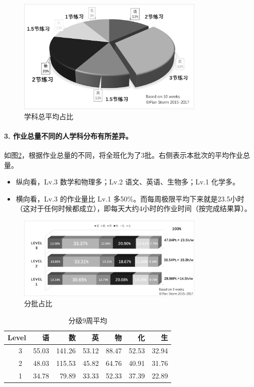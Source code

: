 \documentclass[a4paper,12pt]{article}
\begin{document}
\begin{CJK}{UTF8}{song}
\begin{figure}[H]
    \centering
    \includegraphics[width=0.8\textwidth]{img/2.png}
    \caption{学科总平均占比}
    \label{ratio}
\end{figure}

\paragraph{3. 作业总量不同的人学科分布有所差异。 } 如图\ref{lv}，根据作业总量的不同，将全班化为了3批。右侧表示本批次的平均作业总量。
\begin{itemize}
    \item 纵向看，Lv.3 数学和物理多；Lv.2 语文、英语、生物多；Lv.1 化学多。
    \item 横向看，Lv.3 的作业量比 Lv.1 多50\%。而每周极限平均下来就是23.5小时（这对于任何时候都成立），即每天大约4小时的作业时间（按完成结果算）。
\end{itemize}

\begin{figure}[H]
    \centering
    \includegraphics[width=0.8\textwidth]{img/3.png}
    \caption{分批占比}
    \label{lv}
\end{figure}

\begin{table}
    \centering
    \caption{分级9周平均}
    \begin{tabular}{c|rrrrrr}
        Level & 语 & 数 & 英 & 物 & 化 & 生\\
        \hline
        　3 & 55.03 & 141.26 & 53.12 & 88.47 & 52.53 & 32.94\\
        　2 & 48.03 & 115.53 & 45.82 & 64.76 & 40.91 & 31.76\\
        　1 & 34.78 & 79.89 & 33.33 & 52.33 & 37.39 & 22.89\\
    \end{tabular}
\end{table}


\end{CJK}
\end{document}
